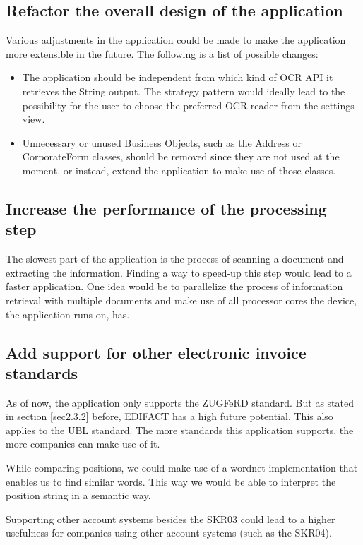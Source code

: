 \subsection{Refactor the overall design of the application} 
Various adjustments in the application could be made to make the application more extensible in the future. The following is a list of possible changes:
	\begin{itemize}
		\item The application should be independent from which kind of OCR API it retrieves the String output. The strategy pattern would ideally lead to the possibility for the user to choose the preferred OCR reader from the settings view.
		\item Unnecessary or unused Business Objects, such as the Address or CorporateForm classes, should be removed since they are not used at the moment, or instead, extend the application to make use of those classes.
	\end{itemize}

\subsection{Increase the performance of the processing step} 
The slowest part of the application is the process of scanning a document and extracting the information. Finding a way to speed-up this step would lead to a faster application. One idea would be to parallelize the process of information retrieval with multiple documents and make use of all processor cores the device, the application runs on, has.

\subsection{Add support for other electronic invoice standards}
\label{sec6.3.4}
As of now, the application only supports the ZUGFeRD standard. But as stated in section \ref{sec2.3.2} before, EDIFACT has a high future potential. This also applies to the UBL standard. The more standards this application supports, the more companies can make use of it.

While comparing positions, we could make use of a wordnet implementation that enables us to find similar words. This way we would be able to interpret the position string in a semantic way.

Supporting other account systems besides the SKR03 could lead to a higher usefulness for companies using other account systems (such as the SKR04).